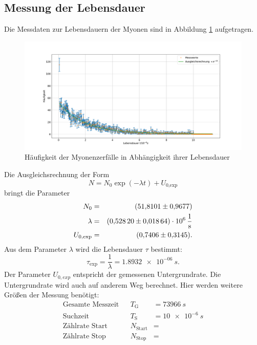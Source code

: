 \subsection{Messung der Lebensdauer}
Die Messdaten zur Lebensdauern der Myonen sind in Abbildung \ref{fig:myonen} aufgetragen.
\begin{figure}[h!]
  \centering
  \includegraphics[width=\textwidth]{figmyonen.pdf}
  \caption{Häufigkeit der Myonenzerfälle in Abhängigkeit ihrer Lebensdauer}
  \label{fig:myonen}
\end{figure}
Die Ausgleichsrechnung der Form
\begin{equation*}
  N = N_{0} \exp{(- \lambda t)}+U_{\text{0,exp}}
\end{equation*}
bringt die Parameter
\begin{align*}
  N_{0}              &=&  \SI{51.8101 \pm 0.9677}{}\\
  \lambda            &=&  \SI{0.5282 \pm 0.01864 e06}{\frac{1}{s}}\\
  U_{\text{0,exp}}   &=&  \SI{0.7406 \pm 0.3145}{}.\\
\end{align*}
Aus dem Parameter $\lambda$ wird die Lebensdauer $\tau$ bestimmt:
\begin{equation*}
  \tau_{\text{exp}}=\frac{1}{\lambda}=\SI{1.8932e-06}{s}.
\end{equation*}
Der Parameter $U_{0,exp}$ entspricht der gemessenen Untergrundrate.
Die Untergrundrate wird auch auf anderem Weg berechnet.
Hier werden weitere Größen der Messung benötigt:
\begin{align*}
  \text{Gesamte Messzeit}  && T_{\text{G}}      &=\SI{73966}{s} \\
  \text{Suchzeit}          && T_{\text{S}}      &=\SI{10e-6}{s} \\
  \text{Zählrate Start}    && N_{\text{Start}}  &=\SI{}{} \\
  \text{Zählrate Stop}     && N_{\text{Stop}}   &=\SI{}{} \\
\end{align*}
